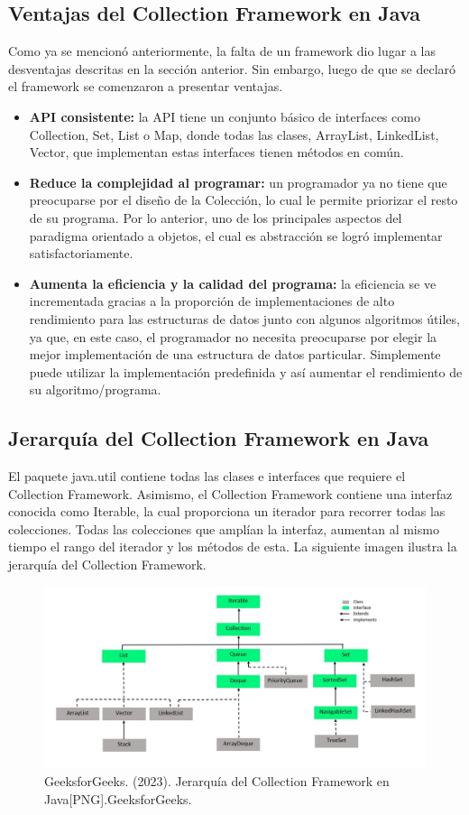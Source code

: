 \documentclass{report}
\begin{document}
      \subsection*{Ventajas del Collection Framework en Java}
      Como ya se mencionó anteriormente, la falta de un framework dio lugar a las desventajas descritas en la sección anterior. Sin embargo, luego de que se declaró el framework se comenzaron a presentar ventajas.
      \begin{itemize}
          \item \textbf{API consistente:} la API tiene un conjunto básico de interfaces como Collection, Set, List o Map, donde todas las clases, ArrayList, LinkedList, Vector, que implementan estas interfaces tienen métodos en común.
          \item \textbf{Reduce la complejidad al programar:} un programador ya no tiene que preocuparse por el diseño de la Colección, lo cual le permite priorizar el resto de su programa. Por lo anterior, uno de los principales aspectos del paradigma orientado a objetos, el cual es abstracción se logró implementar satisfactoriamente.
          \item \textbf{Aumenta la eficiencia y la calidad del programa:} la eficiencia se ve incrementada gracias a la proporción de implementaciones de alto rendimiento para las estructuras de datos junto con algunos algoritmos útiles, ya que, en este caso, el programador no necesita preocuparse por elegir la mejor implementación de una estructura de datos particular. Simplemente puede utilizar la implementación predefinida y así aumentar el rendimiento de su algoritmo/programa.
      \end{itemize}
      \newpage
      \subsection*{Jerarquía del Collection Framework en Java}El paquete java.util contiene todas las clases e interfaces que requiere el Collection Framework. Asimismo, el Collection Framework contiene una interfaz conocida como Iterable, la cual proporciona un iterador para recorrer todas las colecciones. Todas las colecciones que amplían la interfaz, aumentan al mismo tiempo el rango del iterador y los métodos de esta. La siguiente imagen ilustra la jerarquía del Collection Framework.
    \begin{figure}[h]
    \centering
    \includegraphics[width=1\linewidth]{Collection-Framework-1.png}
    \caption{GeeksforGeeks. (2023). Jerarquía del Collection Framework en Java[PNG].GeeksforGeeks.}
\end{figure}
\end{document}

